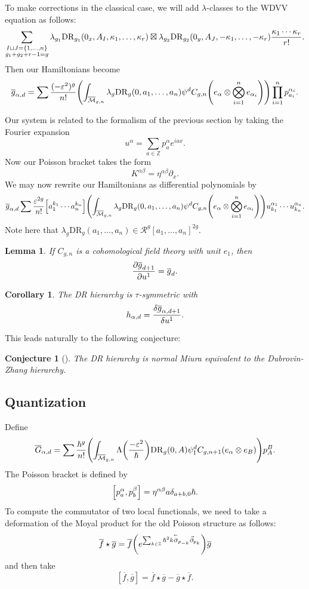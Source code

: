 \documentclass[leqno, openany]{memoir}
\newtheorem{cor}[thm]{Corollary}
\newtheorem{lem}[thm]{Lemma}
\newtheorem{conj}[thm]{Conjecture}
\theoremstyle{definition}
\theoremstyle{remark}
\theoremstyle{plain}
\theoremstyle{definition}
\theoremstyle{remark}
\newcommand{\Z}{\mathbb{Z}}
\newcommand{\ep}{\varepsilon}
\newcommand{\mc}[1]{\mathcal{#1}}
\newcommand{\mr}[1]{\mathrm{#1}}
\newcommand{\ol}[1]{\overline{#1}}
\begin{document}
To make corrections in the classical case, we will add $\lambda$-classes to the WDVV equation as follows:
\[ \sum_{\substack{I \sqcup J = \qty{1, \ldots,n} \\ g_1+g_2+r-1=g}} \lambda_{g_1} \mr{DR}_{g_1}(0_x, A_I, \kappa_1, \ldots, \kappa_r) \boxtimes \lambda_{g_2} \mr{DR}_{g_2}(0_y, A_J, -\kappa_1, \ldots, -\kappa_r)\frac{\kappa_1 \cdots \kappa_r}{r!}. \]
Then our Hamiltonians become
\[ \ol{g}_{\alpha, d} = \sum \frac{(-\ep^2)^g}{n!} \qty(\int_{\ol{\mc{M}}_{g, n}} \lambda_g \mr{DR}_g(0, a_1, \ldots, a_n) \psi^d C_{g, n}\qty(e_{\alpha} \otimes \bigotimes_{i=1}^n e_{\alpha_i})) \prod_{i=1}^n p_{a_i}^{\alpha_i}. \]

Our system is related to the formalism of the previous section by taking the Fourier expansion
\[ u^{\alpha} = \sum_{a \in \Z} p_a^{\alpha} e^{iax}. \]
Now our Poisson bracket takes the form
\[ K^{\alpha\beta} = \eta^{\alpha\beta} \partial_x. \]
We may now rewrite our Hamiltonians as differential polynomials by
\[ \ol{g}_{\alpha, d} \sum \frac{\ep^{2g}}{n!} \qty[a_1^{k_1} \cdots a_n^{k_n}] \qty(\int_{\ol{\mc{M}}_{g, n}} \lambda_g \mr{DR}_g(0, a_1, \ldots, a_n) \psi^d C_{g, n}\qty(e_{\alpha} \otimes \bigotimes_{i=1}^n e_{\alpha_i})) u_{k_1}^{\alpha_1} \cdots u_{k_n}^{\alpha_n}. \]
Note here that $\lambda_g \mr{DR}_g(a_1, \ldots, a_n) \in \mc{R}^g[a_1, \ldots, a_n]^{2g}$.

\begin{lem}
    If $C_{g, n}$ is a cohomological field theory with unit $e_1$, then
    \[ \pdv{\ol{g}_{d+1}}{u^1} = \ol{g}_d. \]
\end{lem}

\begin{cor}
    The DR hierarchy is $\tau$-symmetric with
    \[ h_{\alpha, d} = \fdv{\ol{g}_{\alpha,d+1}}{u^1}. \]
\end{cor}

This leads naturally to the following conjecture:
\begin{conj}[\cite{taudrhierarchy}]\label{conj:drdz}
    The DR hierarchy is normal Miura equivalent to the Dubrovin-Zhang hierarchy.
\end{conj}

\subsection{Quantization}

Define
\[ \ol{G}_{\alpha, d} = \sum \frac{\hslash^g}{n!} \qty(\int_{\ol{\mc{M}}_{g, n}} \Lambda \qty(\frac{-\ep^2}{\hslash}) \mr{DR}_g(0, A) \psi_1^d C_{g,n+1}(e_{\alpha} \otimes e_B))p_A^B. \]
The Poisson bracket is defined by
\[ \qty[p_a^{\alpha}, p_b^{\beta}] = \eta^{\alpha\beta} a \delta_{a+b,0} \hslash. \]
To compute the commutator of two local functionals, we need to take a deformation of the Moyal product for the old Poisson structure as follows:
\[ \ol{f} \star \ol{g} = \ol{f} \qty(e^{\sum_{k \in \Z} \hslash^2 k \overset{\shortleftarrow}{\partial}_{p_{-k}} \vec{\partial}_{p_k}}) \ol{g} \]
and then take
\[ [\ol{f}, \ol{g}] = \ol{f} \star \ol{g} - \ol{g} \star \ol{f}. \]
\end{document}
